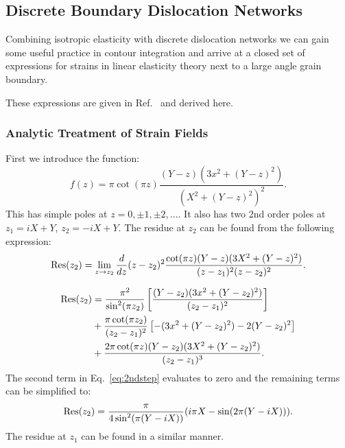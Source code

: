 \subsection{Discrete Boundary Dislocation Networks}
Combining isotropic elasticity with discrete dislocation networks
we can gain some useful practice in contour integration and arrive
at a closed set of expressions for strains in linear elasticity
theory next to a large angle grain boundary. 

These expressions are given in Ref.~\cite{sutton95} and derived here.

\subsubsection{Analytic Treatment of Strain Fields}
\label{gbalgebra}
First we introduce the function:
%
\begin{equation}
f(z) =  \pi\cot(\pi z)\frac{(Y-z)(3x^{2} + (Y-z)^{2})}{(X^{2} + (Y-z)^{2})^{2}}.
\end{equation}
%
This has simple poles at $z = 0, \pm 1, \pm 2,...$. It also has two 2nd 
order poles at  $z_{1}=iX+Y$, $z_{2}=-iX+Y$. The residue at $z_{2}$ can
be found from the following expression: 
%
\begin{equation}
{\rm Res}(z_{2}) = \lim_{z\rightarrow z_{2}}\frac{d}{dz}(z-z_{2})^{2}
\frac{\cot(\pi z)(Y-z)(3X^{2}+(Y-z)^2)}{(z-z_{1})^{2}(z-z_{2})^{2}}.
\end{equation}


\begin{align}
\label{eq:2ndstep}
{\rm Res}(z_{2})&=\frac{\pi^{2}}{\sin^{2}(\pi z_{2})}\left[\frac{(Y-z_{2})(3x^{2}+(Y-z_{2})^{2})}{(z_{2}-z_{1})^{2}}\right]\\
  &+\frac{\pi\cot(\pi z_{2})}{(z_{2}-z_{1})^{2}}\left[-(3x^{2} + (Y-z_{2})^{2})-2(Y-z_{2})^{2}\right] \\
  &+\frac{2\pi\cot(\pi z)(Y-z_{2})(3X^{2}+(Y-z_{2})^{2})}{(z_{2} - z_{1})^{3}}.
\end{align}
%
The second term in Eq.~\ref{eq:2ndstep} evaluates to zero and the remaining terms can be simplified to:
%
\begin{equation}
{\rm Res}(z_{2}) = \frac{\pi}{4\sin^{2}(\pi(Y-iX))}(i\pi X - \sin(2\pi(Y-iX))).
\end{equation}
%
The residue at $z_{1}$ can be found in a similar manner.

